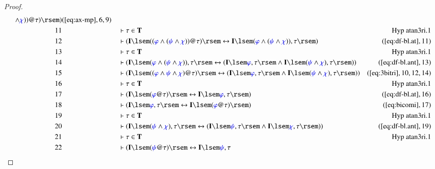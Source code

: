 \begin{proof}
\begin{align}
      \wedge \mw{\chi} ) ) @ \tau ) \rsem
      )&(\mbox{\ref{eq:ax-mp}},6,9)\notag
  \\ 11 &&  & \vdash \tau \in
      \mathbf{T}&\text{Hyp~atan3ri.1}\notag%
  \\ 12 &&  & \vdash ( \mathbf{I} \lsem ( ( \mw{\varphi} \wedge ( \mw{\psi}
      \wedge \mw{\chi} ) ) @ \tau ) \rsem \leftrightarrow
      \mathbf{I} \lsem ( \mw{\varphi} \wedge ( \mw{\psi}
      \wedge \mw{\chi} ) ) , \tau \rsem
      )&(\mbox{\ref{eq:df-bl.at}},11)\notag
  \\ 13 &&  & \vdash \tau \in
      \mathbf{T}&\text{Hyp~atan3ri.1}\notag%
  \\ 14 &&  & \vdash ( \mathbf{I} \lsem ( \mw{\varphi} \wedge ( \mw{\psi}
      \wedge \mw{\chi} ) ) , \tau \rsem \leftrightarrow (
      \mathbf{I} \lsem \mw{\varphi} , \tau \rsem \wedge
      \mathbf{I} \lsem ( \mw{\psi} \wedge \mw{\chi} ) ,
      \tau \rsem ) )&(\mbox{\ref{eq:df-bl.ant}},13)\notag
  \\ 15 &&  & \vdash ( \mathbf{I} \lsem ( ( \mw{\varphi} \wedge \mw{\psi}
      \wedge \mw{\chi} ) @ \tau ) \rsem \leftrightarrow (
      \mathbf{I} \lsem \mw{\varphi} , \tau \rsem \wedge
      \mathbf{I} \lsem ( \mw{\psi} \wedge \mw{\chi} ) ,
      \tau \rsem )
      )&(\mbox{\ref{eq:3bitri}},10,12,14)\notag
  \\ 16 &&  & \vdash \tau \in
      \mathbf{T}&\text{Hyp~atan3ri.1}\notag%
  \\ 17 &&  & \vdash ( \mathbf{I} \lsem ( \mw{\varphi} @ \tau ) \rsem
      \leftrightarrow \mathbf{I} \lsem \mw{\varphi} , \tau
      \rsem )&(\mbox{\ref{eq:df-bl.at}},16)\notag
  \\ 18 &&  & \vdash ( \mathbf{I} \lsem \mw{\varphi} , \tau \rsem
      \leftrightarrow \mathbf{I} \lsem ( \mw{\varphi} @
      \tau ) \rsem )&(\mbox{\ref{eq:bicomi}},17)\notag
  \\ 19 &&  & \vdash \tau \in
      \mathbf{T}&\text{Hyp~atan3ri.1}\notag%
  \\ 20 &&  & \vdash ( \mathbf{I} \lsem ( \mw{\psi} \wedge \mw{\chi} ) , \tau
      \rsem \leftrightarrow ( \mathbf{I} \lsem \mw{\psi} ,
      \tau \rsem \wedge \mathbf{I} \lsem \mw{\chi} , \tau
      \rsem ) )&(\mbox{\ref{eq:df-bl.ant}},19)\notag
  \\ 21 &&  & \vdash \tau \in
      \mathbf{T}&\text{Hyp~atan3ri.1}\notag%
  \\ 22 &&  & \vdash ( \mathbf{I} \lsem ( \mw{\psi} @ \tau ) \rsem
      \leftrightarrow \mathbf{I} \lsem \mw{\psi} , \tau

\end{align}
\end{proof}
